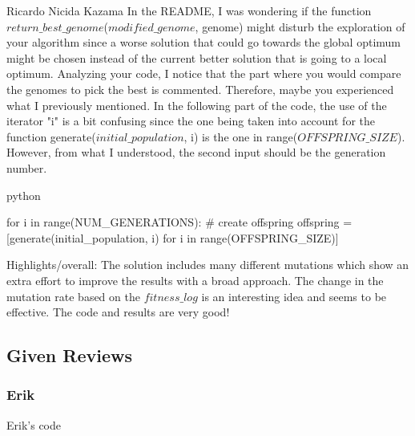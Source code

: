 \begin{tcolorbox}[colback=green!5!white,colframe=green!75!black,code={\singlespacing}]
   Ricardo Nicida Kazama
\tcblower
In the README, I was wondering if the function $return\_best\_genome$($modified\_genome$, genome) might disturb the exploration of your algorithm since a worse solution that could go towards the global optimum might be chosen instead of the current better solution that is going to a local optimum. Analyzing your code, I notice that the part where you would compare the genomes to pick the best is commented. Therefore, maybe you experienced what I previously mentioned.
In the following part of the code, the use of the iterator "i" is a bit confusing since the one being taken into account for the function generate($initial\_population$, i) is the one in range($OFFSPRING\_SIZE$). However, from what I understood, the second input should be the generation number.

\begin{mintedbox}{python}

for i in range(NUM_GENERATIONS):
    # create offspring
    offspring = [generate(initial_population, i) for i in range(OFFSPRING_SIZE)]
\end{mintedbox}

Highlights/overall:
The solution includes many different mutations which show an extra effort to improve the results with a broad approach.
The change in the mutation rate based on the $fitness\_log$ is an interesting idea and seems to be effective.
The code and results are very good!
\end{tcolorbox}

\subsection{Given Reviews}

\subsubsection{Erik}

Erik's code

